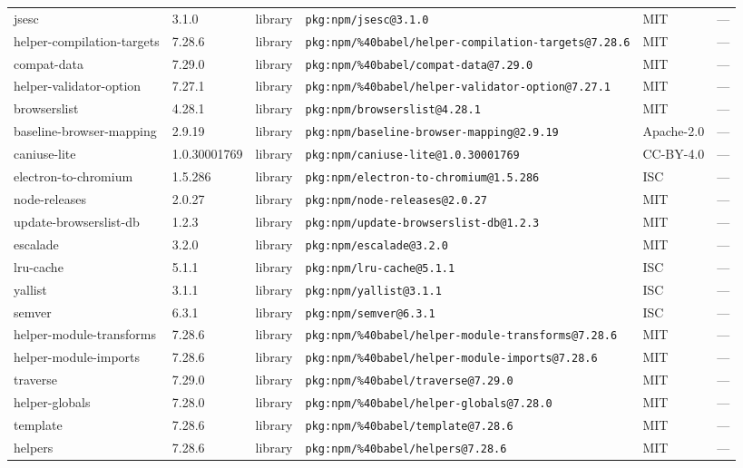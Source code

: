 \documentclass[11pt]{article}
\begin{document}
\begin{longtable}{|l|l|l|p{2.2cm}|l|p{4cm}|}
jsesc & 3.1.0 & library & \texttt{pkg:npm/jsesc@3.1.0} & MIT & — \\
helper-compilation-targets & 7.28.6 & library & \texttt{pkg:npm/\%40babel/helper-compilation-targets@7.28.6} & MIT & — \\
compat-data & 7.29.0 & library & \texttt{pkg:npm/\%40babel/compat-data@7.29.0} & MIT & — \\
helper-validator-option & 7.27.1 & library & \texttt{pkg:npm/\%40babel/helper-validator-option@7.27.1} & MIT & — \\
browserslist & 4.28.1 & library & \texttt{pkg:npm/browserslist@4.28.1} & MIT & — \\
baseline-browser-mapping & 2.9.19 & library & \texttt{pkg:npm/baseline-browser-mapping@2.9.19} & Apache-2.0 & — \\
caniuse-lite & 1.0.30001769 & library & \texttt{pkg:npm/caniuse-lite@1.0.30001769} & CC-BY-4.0 & — \\
electron-to-chromium & 1.5.286 & library & \texttt{pkg:npm/electron-to-chromium@1.5.286} & ISC & — \\
node-releases & 2.0.27 & library & \texttt{pkg:npm/node-releases@2.0.27} & MIT & — \\
update-browserslist-db & 1.2.3 & library & \texttt{pkg:npm/update-browserslist-db@1.2.3} & MIT & — \\
escalade & 3.2.0 & library & \texttt{pkg:npm/escalade@3.2.0} & MIT & — \\
lru-cache & 5.1.1 & library & \texttt{pkg:npm/lru-cache@5.1.1} & ISC & — \\
yallist & 3.1.1 & library & \texttt{pkg:npm/yallist@3.1.1} & ISC & — \\
semver & 6.3.1 & library & \texttt{pkg:npm/semver@6.3.1} & ISC & — \\
helper-module-transforms & 7.28.6 & library & \texttt{pkg:npm/\%40babel/helper-module-transforms@7.28.6} & MIT & — \\
helper-module-imports & 7.28.6 & library & \texttt{pkg:npm/\%40babel/helper-module-imports@7.28.6} & MIT & — \\
traverse & 7.29.0 & library & \texttt{pkg:npm/\%40babel/traverse@7.29.0} & MIT & — \\
helper-globals & 7.28.0 & library & \texttt{pkg:npm/\%40babel/helper-globals@7.28.0} & MIT & — \\
template & 7.28.6 & library & \texttt{pkg:npm/\%40babel/template@7.28.6} & MIT & — \\
helpers & 7.28.6 & library & \texttt{pkg:npm/\%40babel/helpers@7.28.6} & MIT & — \\

\end{longtable}
\end{document}
